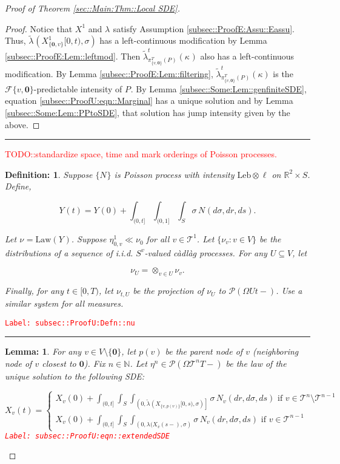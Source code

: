 \documentclass[12pt]{article}
\newcommand{\mb}{\mathbb}
\newcommand{\mc}{\mathcal}
\newcommand{\ov}{\overline}
\newcommand{\te}{\text}
\newcommand{\tr}{\textcolor{red}}
\newcommand{\labe}[1]{\tr{\texttt{Label: #1}}}
\newcommand{\lin}{\rule{\linewidth}{0.4 pt}}
\newcommand{\pmsr}{\mc{P}}							%
\renewcommand{\root}{\mathbf{0}}				%
\renewcommand{\v}{v}							%
\renewcommand{\U}{U}							%
\renewcommand{\S}{S}							%
\newcommand{\s}{\sigma}							%
\newcommand{\T}{T}								%
\renewcommand{\t}{t}							%
\renewcommand{\tt}{s}							%
\newcommand{\F}{\mc{F}}							%
\newcommand{\cl}{\ov}							%
\newcommand{\poiss}[1]{N_{#1}}						%
\newcommand{\law}{\te{Law}}							%
\newcommand{\leb}{\te{Leb}}							%
\newcommand{\pup}[1]{^{#1}}							%
\newcommand{\tree}{\mc{T}}							%
\newcommand{\V}{V}									%
\renewcommand{\r}{r}								%
\newcommand{\numb}{n}								%
\newcommand{\piV}[2]{\pi_{#1}^{#2}}					%
\newcommand{\rxvt}[2]{X_{#1}{(#2)}}					%
\newcommand{\rxvtt}[2]{Y_{#1}{(#2)}}				%
\newcommand{\rxvts}[2]{X_{#1}{#2}}					%
\newcommand{\rxvtsn}[3]{X_{#1}^{#3}{#2}}			%
\newcommand{\rxvtts}[2]{Y_{#1}{#2}}					%
\newcommand{\rp}[1]{P^{#1}}							%
\newcommand{\mm}[3]{\nu_{#2#1}^{#3}}						%
\newcommand{\mmm}[3]{\eta_{#2#1}^{#3}}						%
\newcommand{\rate}[1]{\lambda_{#1}}					%
\newcommand{\crate}[2]{\alt{\lambda}_{#1}^{#2}}		%
\newcommand{\Sm}{\ell}								%
\newcommand{\alt}{\widetilde}						%
\renewcommand{\mark}[1]{\kappa^{#1}}				%
\newcommand{\p}[1]{p(#1)}						%
\newtheorem{lem}[thms]{Lemma: }
\newtheorem{defn}[thms]{Definition: }
\begin{document}
\begin{proof}[Proof of Theorem \ref{sec::Main:Thm::Local SDE}]
\begin{proof}
Notice that \(\rxvtsn{}{}{1}\) and \(\rate{}\) satisfy Assumption \ref{subsec::ProofE:Assu::Eassu}. Thus, \(\crate{}{}(\rxvtsn{\{\root,\v\}}{[0,\t)}{1},\s)\) has a left-continuous modification by Lemma \ref{subsec::ProofE:Lem::leftmod}. Then \(\crate{\piV{\{\v,\root\}}{\T}(\rp{})}{\t}(\mark{})\) also has a left-continuous modification. By Lemma \ref{subsec::ProofE:Lem::filtering}, \(\crate{\piV{\{\v,\root\}}{\T}(\rp{})}{\t}(\kappa)\) is the \(\F{\{\v,\root\}}{}\)-predictable intensity of \(\rp{}\). By Lemma \ref{subsec::Some:Lem::genfiniteSDE}, equation \eqref{subsec::ProofU:eqn::Marginal} has a unique solution and by Lemma \ref{subsec::Some:Lem::PPtoSDE}, that solution has jump intensity given by the above.

\end{proof}

\lin

\tr{TODO::standardize space, time and mark orderings of Poisson processes.}

\begin{defn}
Suppose \(\{\poiss{}\}\) is Poisson process with intensity \(\leb\otimes \Sm\) on \(\mb{R}^2\times \S\). Define,

\[\rxvtt{}{\t} = \rxvtt{}{0} + \int_{(0,\t]}\int_{(0,1]}\int_\S\s\,\poiss{}(d\s,d\r,d\tt).\]

Let \(\mm{}{}{} = \law(\rxvtts{}{})\). Suppose \(\mmm{\v}{0,}{1}\ll\mm{}{0}{}\) for all \(\v\in\tree\pup{1}\). Let \(\{\mm{\v}{}{}:\v\in\V\}\) be the distributions of a sequence of i.i.d. \(\S^{\v}\)-valued c\`adl\`ag processes. For any \(\U\subseteq \V\), let 

\[\mm{\U}{}{} = \otimes_{\v\in\U} \mm{\v}{}{}.\]

Finally, for any \(\t\in [0,\T)\), let \(\mm{\U}{\t,}{}\) be the projection of \(\mm{\U}{}{}\) to \(\pmsr(\Omega{\U}{\t-})\). Use a similar system for all measures.
\label{subsec::ProofU:Defn::nu}
\end{defn}
\labe{subsec::ProofU:Defn::nu}

\lin

\begin{lem}
For any \(\v \in \V\setminus\{\root\}\), let \(\p{\v}\) be the parent node of \(\v\) (neighboring node of \(\v\) closest to \(\root\)). Fix \(\numb \in \mb{N}\). Let \(\mmm{}{}{\numb} \in \pmsr\left(\Omega{\tree\pup{\numb}}{\T-}\right)\) be the law of the unique solution to the following SDE:

\begin{equation}
\rxvt{\v}{\t} = \begin{cases}
\rxvt{\v}{0} + \int_{(0,\t]}\int_\S\int_{\left(0,\crate{}{}(\rxvts{\{\v,\p{\v}\}}{[0,\tt)},\s)\right]}\s\,\poiss{\v}(d\r,d\s,d\tt)\te{ if } \v \in \tree\pup{\numb}\setminus \tree\pup{\numb-1}\\
\rxvt{\v}{0} + \int_{(0,\t]}\int_\S\int_{\left(0,\rate{}(\rxvt{\cl{\v}}{\tt-},\s\right)}\s\,\poiss{\v}(d\r,d\s,d\tt)\te{ if } \v \in \tree\pup{\numb-1}
\end{cases}
\label{subsec::ProofU:eqn::extendedSDE}
\end{equation}
\labe{subsec::ProofU:eqn::extendedSDE}


\end{lem}
\end{proof}
\end{document}
